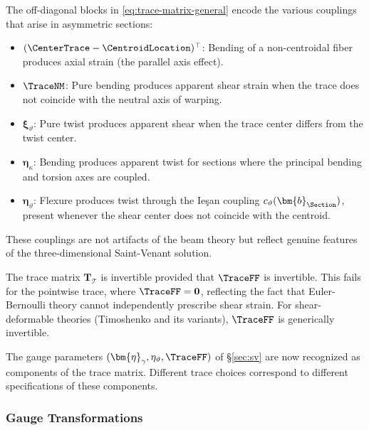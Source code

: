 \begin{remark}
The off-diagonal blocks in \eqref{eq:trace-matrix-general} encode the 
various couplings that arise in asymmetric sections:
\begin{itemize}
\item $(\CenterTrace - \CentroidLocation)^\top$: Bending of a non-centroidal 
fiber produces axial strain (the parallel axis effect).

\item $\TraceNM$: Pure bending produces apparent shear strain 
when the trace does not coincide with the neutral axis of warping.

\item $\bm{\xi}_\vartheta$: Pure twist produces apparent shear when the trace 
center differs from the twist center.

\item $\bm{\eta}_\kappa$: Bending produces apparent twist for sections where 
the principal bending and torsion axes are coupled.

\item $\bm{\eta}_\vartheta$: Flexure produces twist through the Ieşan coupling 
$c_\vartheta(\bm{b}_{\Section})$, present whenever the shear center does not 
coincide with the centroid.
\end{itemize}
These couplings are not artifacts of the beam theory but reflect genuine 
features of the three-dimensional Saint-Venant solution.
\end{remark}

\begin{remark}[Invertibility]
The trace matrix $\mathbf{T}_{\mathcal{T}}$ is invertible provided that 
$\TraceFF$ is invertible. 
This fails for the pointwise trace, 
where $\TraceFF = \mathbf{0}$, reflecting the fact that 
Euler-Bernoulli theory cannot independently prescribe shear strain. 
For shear-deformable theories (Timoshenko and its variants), 
$\TraceFF$ is generically invertible.
\end{remark}

The gauge parameters $(\bm{\eta}_\gamma, \eta_\vartheta, \TraceFF)$ 
of \S\ref{sec:sv} are now recognized as components of the trace matrix. 
Different trace choices correspond to different specifications of these components.

\subsubsection{Gauge Transformations}

